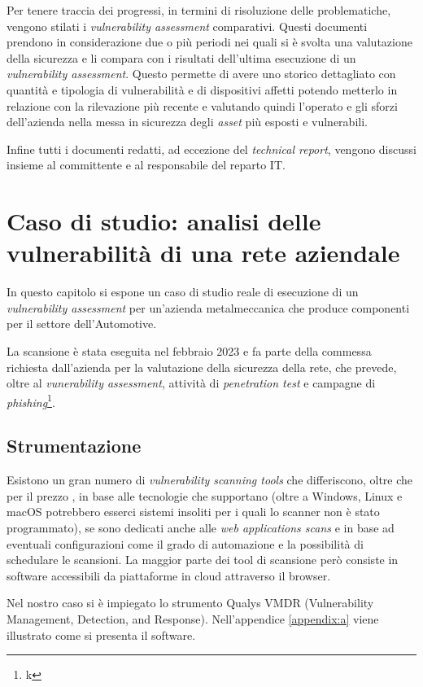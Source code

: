 \documentclass[target=mst,aauheader=]{thud}
\begin{document}
Per tenere traccia dei progressi, in termini di risoluzione delle problematiche, vengono stilati i \textit{vulnerability assessment} 
comparativi. Questi documenti prendono in considerazione due o più periodi nei quali si è svolta una valutazione della sicurezza e li compara con i risultati dell’ultima esecuzione di un \textit{vulnerability assessment}. Questo permette di avere uno storico dettagliato con quantità e tipologia di vulnerabilità e di dispositivi affetti potendo metterlo in relazione con la rilevazione più recente e valutando quindi l’operato e gli sforzi dell’azienda nella messa in sicurezza degli \textit{asset} più esposti e vulnerabili.

Infine tutti i documenti redatti, ad eccezione del \textit{technical report}, vengono discussi insieme al committente e al responsabile del reparto IT.

\chapter{Caso di studio: analisi delle vulnerabilità di una rete aziendale}
In questo capitolo si espone un caso di studio reale di esecuzione di un \textit{vulnerability assessment} per un'azienda metalmeccanica che produce componenti per il settore dell'Automotive.

La scansione è stata eseguita nel febbraio 2023 e fa parte della commessa richiesta dall'azienda per la valutazione della sicurezza della rete, che prevede, oltre al \textit{vunerability assessment}, attività di \textit{penetration test} e campagne di \textit{phishing}\footnote{k}. 

\section{Strumentazione}
Esistono un gran numero di \textit{vulnerability scanning tools} che differiscono, oltre che per il prezzo , in base alle tecnologie che supportano (oltre a Windows, Linux e macOS potrebbero esserci sistemi insoliti per i quali lo scanner non è stato programmato), se sono dedicati anche alle \textit{web applications scans}  e in base ad eventuali configurazioni come il grado di automazione e la possibilità di schedulare le scansioni. La maggior parte dei tool di scansione però consiste in software accessibili da piattaforme in cloud attraverso il browser.

Nel nostro caso si è impiegato lo strumento Qualys VMDR (Vulnerability Management, Detection, and Response). Nell'appendice \ref{appendix:a} viene illustrato come si presenta il software.
\end{document}
